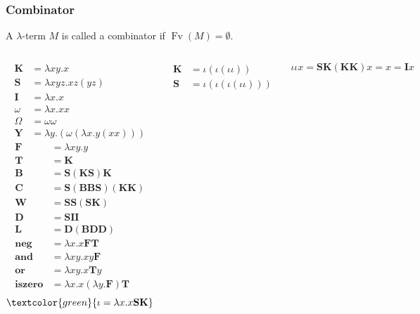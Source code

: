 \documentclass[UTF8,11pt,colorlinks,compress,openany]{beamer}%
\begin{document}
\begin{frame}\frametitle{Combinator}
	\setlength\abovedisplayskip{0pt}
	\setlength\belowdisplayskip{0pt}
	\begin{definition}[Combinator]
		A $\lambda$-term $M$ is called a combinator if $\operatorname{Fv}(M)=\emptyset$.
	\end{definition}
	\begin{columns}
			\begin{align*}
			\mathbf{K}&=\lambda xy.x\\
			\mathbf{S}&=\lambda xyz.xz(yz)\\
			\mathbf{I}&=\lambda x.x\\
			\omega&=\lambda x.xx\\
			\Omega&=\omega\omega\\
			\mathbf{Y}&=\lambda y.(\omega(\lambda x.y(xx)))
			\end{align*}
			\begin{align*}
			\mathbf{F}&=\lambda xy.y\\
			\mathbf{T}&=\mathbf{K}\\
			\mathbf{B}&=\mathbf{S}(\mathbf{K}\mathbf{S})\mathbf{K}\\
			\mathbf{C}&=\mathbf{S}(\mathbf{B}\mathbf{B}\mathbf{S})(\mathbf{K}\mathbf{K})\\
			\mathbf{W}&=\mathbf{S}\mathbf{S}(\mathbf{S}\mathbf{K})\\
			\mathbf{D}&=\mathbf{S}\mathbf{I}\mathbf{I}\\
			\mathbf{L}&=\mathbf{D}(\mathbf{B}\mathbf{D}\mathbf{D})\\
			\mathbf{neg}&=\lambda x.x\mathbf{F}\mathbf{T}\\
			\mathbf{and}&=\lambda xy.xy\mathbf{F}\\
			\mathbf{or}&=\lambda xy.x\mathbf{T}y\\
			\mathbf{iszero}&=\lambda x.x(\lambda y.\mathbf{F})\mathbf{T}
			\end{align*}
			\[\textcolor{green}{\iota=\lambda x.x\mathbf{S}\mathbf{K}}\]
			\begin{block}{}
			\setlength\abovedisplayskip{0pt}
			\setlength\belowdisplayskip{0pt}
				\begin{align*}
				\mathbf{K}&=\iota(\iota(\iota\iota))\\
				\mathbf{S}&=\iota(\iota(\iota(\iota\iota)))
				\end{align*}
			\end{block}
			\[\iota\iota x=\mathbf{S}\mathbf{K}(\mathbf{K}\mathbf{K})x=x=\mathbf{I}x\]
	\end{columns}
\end{frame}
\end{document}
